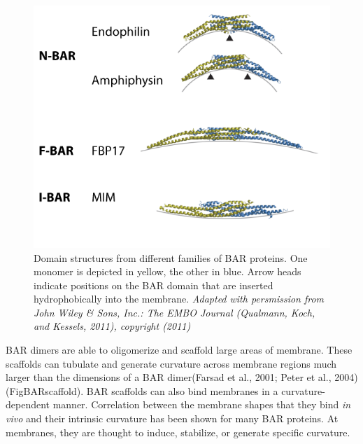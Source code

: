 \begin{figure}[H]
	\centering
	\includegraphics[scale=0.7]{figures/intro/BAR_structures}
		\caption[Structures of BAR domain dimers]{Domain structures from different families of BAR proteins. One monomer is depicted in yellow, the other in blue. Arrow heads indicate positions on the BAR domain that are inserted hydrophobically into the membrane. \textit{Adapted with persmission from John Wiley \& Sons, Inc.: The EMBO Journal (Qualmann, Koch, and Kessels, 2011), copyright (2011)}
		\label{bar_structures}}
\end{figure}

\vspace{5mm}
BAR dimers are able to oligomerize and scaffold large areas of membrane. These scaffolds can tubulate and generate curvature across membrane regions much larger than the dimensions of a BAR dimer(Farsad et al., 2001; Peter et al., 2004) (FigBARscaffold). BAR scaffolds can also bind membranes in a curvature-dependent manner. Correlation between the membrane shapes that they bind \textit{in vivo} and their intrinsic curvature has been shown for many BAR proteins. At membranes, they are thought to induce, stabilize, or generate specific curvature. 



